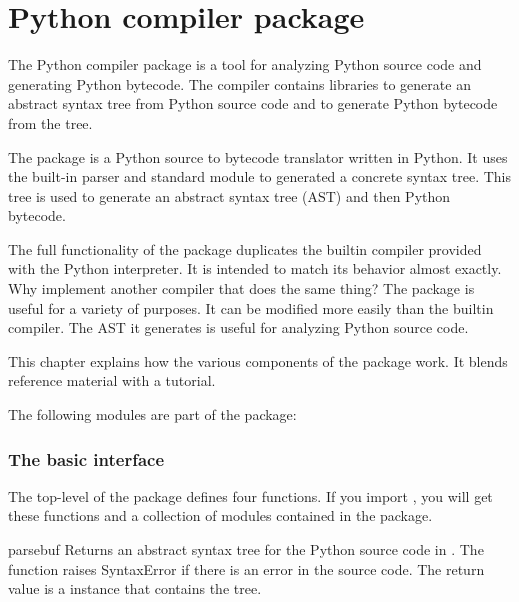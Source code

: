 \chapter{Python compiler package \label{compiler}}



The Python compiler package is a tool for analyzing Python source code
and generating Python bytecode.  The compiler contains libraries to
generate an abstract syntax tree from Python source code and to
generate Python bytecode from the tree.

The  package is a Python source to bytecode
translator written in Python.  It uses the built-in parser and
standard  module to generated a concrete syntax
tree.  This tree is used to generate an abstract syntax tree (AST) and
then Python bytecode.

The full functionality of the package duplicates the builtin compiler
provided with the Python interpreter.  It is intended to match its
behavior almost exactly.  Why implement another compiler that does the
same thing?  The package is useful for a variety of purposes.  It can
be modified more easily than the builtin compiler.  The AST it
generates is useful for analyzing Python source code.

This chapter explains how the various components of the
 package work.  It blends reference material with
a tutorial.

The following modules are part of the  package:

\localmoduletable


\subsection{The basic interface}


The top-level of the package defines four functions.  If you import
, you will get these functions and a collection of
modules contained in the package.

\begin{funcdesc}{parse}{buf}
Returns an abstract syntax tree for the Python source code in .
The function raises SyntaxError if there is an error in the source
code.  The return value is a  instance that
contains the tree.  
\end{funcdesc}

